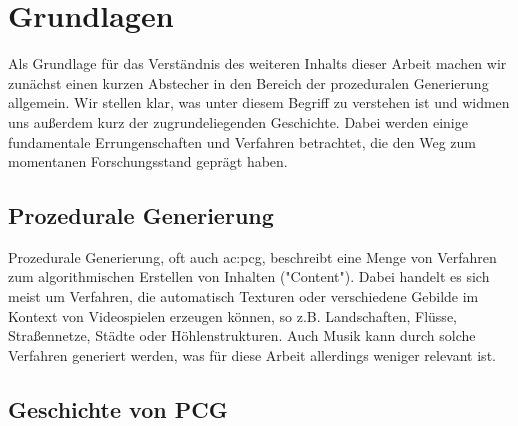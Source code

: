 %
%
%
%
%
%
%
%
%
%
%
%
%

\chapter{Grundlagen}
Als Grundlage für das Verständnis des weiteren Inhalts dieser Arbeit machen wir zunächst einen kurzen Abstecher in den
Bereich der prozeduralen Generierung allgemein. Wir stellen klar, was unter diesem Begriff zu verstehen ist und widmen
uns außerdem kurz der zugrundeliegenden Geschichte. Dabei werden einige fundamentale Errungenschaften und Verfahren
betrachtet, die den Weg zum momentanen Forschungsstand geprägt haben.

\section{Prozedurale Generierung}
Prozedurale Generierung, oft auch \gls{ac:pcg}, beschreibt eine Menge von Verfahren zum
algorithmischen Erstellen von Inhalten ("Content"). Dabei handelt es sich meist um Verfahren, die automatisch Texturen
oder verschiedene Gebilde im Kontext von Videospielen erzeugen können, so z.B. Landschaften, Flüsse, Straßennetze,
Städte oder Höhlenstrukturen. Auch Musik kann durch solche Verfahren generiert werden, was für diese Arbeit allerdings
weniger relevant ist. \cite{9_togelius_et_al}

\section{Geschichte von PCG}
